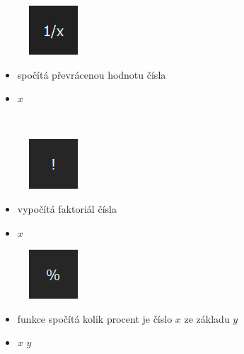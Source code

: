 \documentclass[a4paper, 12pt]{article}
\begin{document}
\begin{minipage}{0.07\textwidth}
\begin{figure}[H]
\includegraphics[scale=0.7]{1x.jpg}
\end{figure}
\end{minipage}
\begin{minipage}{0.45\textwidth}
\begin{itemize}
\item spočítá převrácenou hodnotu čísla
\item  $x$ 
\end{itemize}
\end{minipage}
\\%
\begin{minipage}{0.07\textwidth}
\begin{figure}[H]
\includegraphics[scale=0.7]{fac.jpg}
\end{figure}
\end{minipage}
\begin{minipage}{0.45\textwidth}
\begin{itemize}
\item vypočítá faktoriál čísla
\item $x$ \keys{!}
\end{itemize}
\end{minipage}
\begin{minipage}{0.07\textwidth}
\begin{figure}[H]
\includegraphics[scale=0.7]{procenta.jpg}
\end{figure}
\end{minipage}
\begin{minipage}{0.45\textwidth}
\begin{itemize}
\item funkce spočítá kolik procent je číslo $x$ ze základu $y$
\item $x$ \keys{\%} $y$ \keys{=}
\end{itemize}
\end{minipage}
\end{document}
